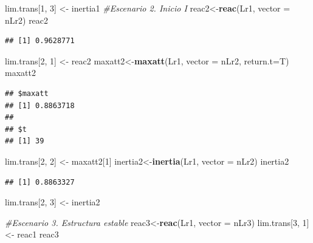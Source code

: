\documentclass[
]{book}
\newenvironment{Shaded}{\begin{snugshade}}{\end{snugshade}}
\newcommand{\AttributeTok}[1]{\textcolor[rgb]{0.13,0.29,0.53}{#1}}
\newcommand{\CommentTok}[1]{\textcolor[rgb]{0.56,0.35,0.01}{\textit{#1}}}
\newcommand{\DecValTok}[1]{\textcolor[rgb]{0.00,0.00,0.81}{#1}}
\newcommand{\FunctionTok}[1]{\textcolor[rgb]{0.13,0.29,0.53}{\textbf{#1}}}
\newcommand{\NormalTok}[1]{#1}
\newcommand{\OtherTok}[1]{\textcolor[rgb]{0.56,0.35,0.01}{#1}}
\theoremstyle{definition}
\theoremstyle{definition}
\theoremstyle{definition}
\theoremstyle{definition}
\theoremstyle{remark}
\begin{document}
\begin{Shaded}
\begin{Highlighting}[]
\NormalTok{lim.trans[}\DecValTok{1}\NormalTok{, }\DecValTok{3}\NormalTok{] }\OtherTok{\textless{}{-}}\NormalTok{ inertia1}
\CommentTok{\#Escenario 2. Inicio I}
\NormalTok{reac2}\OtherTok{\textless{}{-}}\FunctionTok{reac}\NormalTok{(Lr1, }\AttributeTok{vector =}\NormalTok{ nLr2)}
\NormalTok{reac2}
\end{Highlighting}
\end{Shaded}

\begin{verbatim}
## [1] 0.9628771
\end{verbatim}

\begin{Shaded}
\begin{Highlighting}[]
\NormalTok{lim.trans[}\DecValTok{2}\NormalTok{, }\DecValTok{1}\NormalTok{] }\OtherTok{\textless{}{-}}\NormalTok{ reac2}
\NormalTok{maxatt2}\OtherTok{\textless{}{-}}\FunctionTok{maxatt}\NormalTok{(Lr1, }\AttributeTok{vector =}\NormalTok{ nLr2, }\AttributeTok{return.t=}\NormalTok{T)}
\NormalTok{maxatt2}
\end{Highlighting}
\end{Shaded}

\begin{verbatim}
## $maxatt
## [1] 0.8863718
## 
## $t
## [1] 39
\end{verbatim}

\begin{Shaded}
\begin{Highlighting}[]
\NormalTok{lim.trans[}\DecValTok{2}\NormalTok{, }\DecValTok{2}\NormalTok{] }\OtherTok{\textless{}{-}}\NormalTok{ maxatt2[}\DecValTok{1}\NormalTok{]}
\NormalTok{inertia2}\OtherTok{\textless{}{-}}\FunctionTok{inertia}\NormalTok{(Lr1, }\AttributeTok{vector =}\NormalTok{ nLr2)}
\NormalTok{inertia2}
\end{Highlighting}
\end{Shaded}

\begin{verbatim}
## [1] 0.8863327
\end{verbatim}

\begin{Shaded}
\begin{Highlighting}[]
\NormalTok{lim.trans[}\DecValTok{2}\NormalTok{, }\DecValTok{3}\NormalTok{] }\OtherTok{\textless{}{-}}\NormalTok{ inertia2}

\CommentTok{\#Escenario 3. Estructura estable}
\NormalTok{reac3}\OtherTok{\textless{}{-}}\FunctionTok{reac}\NormalTok{(Lr1, }\AttributeTok{vector =}\NormalTok{ nLr3)}
\NormalTok{lim.trans[}\DecValTok{3}\NormalTok{, }\DecValTok{1}\NormalTok{] }\OtherTok{\textless{}{-}}\NormalTok{ reac1}
\NormalTok{reac3}
\end{Highlighting}
\end{Shaded}
\end{document}
